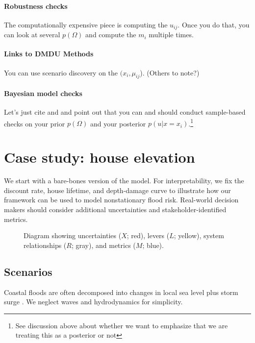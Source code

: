 \documentclass[12pt]{article}
\begin{document}
\paragraph{Robustness checks}
The computationally expensive piece is computing the $u_{ij}$.
Once you do that, you can look at several $p(\Omega)$ and compute the $m_i$ multiple times.

\paragraph{Links to DMDU Methods}
You can use scenario discovery on the $(x_i, \mu_{ij}$).
(Others to note?)

\paragraph{Bayesian model checks}
Let's just cite \citet{gelman_workflow:2020} and \citet{gabry_visualization:2019} and point out that you can and should conduct sample-based checks on your prior $p(\Omega)$ and your posterior $p(u | x=x_i)$.\footnote{See discussion above about whether we want to emphasize that we are treating this as a posterior or not}

\section{Case study: house elevation}\label{sec:case}

We start with a bare-bones version of the \citet{zarekarizi_suboptimal:2020} model.
For interpretability, we fix the discount rate, house lifetime, and depth-damage curve to illustrate how our framework can be used to model nonstationary flood risk.
Real-world decision makers should consider additional uncertainties and stakeholder-identified metrics.

\begin{figure}
    \centering
    \caption{
        Diagram showing uncertainties ($X$; red), levers ($L$; yellow), system relationships ($R$; gray), and metrics ($M$; blue).
    }\label{fig:xlrm}
\end{figure}

\subsection{Scenarios}

Coastal floods are often decomposed into changes in local sea level \citep{kopp_evolving:2017,kopp_probabilistic:2014,wong_brick0.2:2017} plus storm surge \citep{garner_slrise:2018,cagigal_emulator:2020,rueda_surge:2016}.
We neglect waves and hydrodynamics for simplicity.
\end{document}
